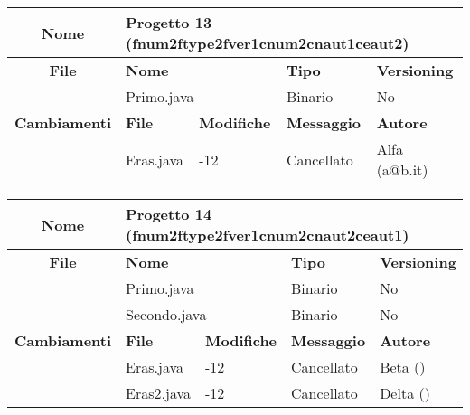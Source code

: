 \begin{table}[ht]
\footnotesize
\begin{tabular}{|c|p{2.5cm}|p{2cm}|p{2.5cm}|p{2.5cm}|}
  \hline
  \textbf{Nome}	& \multicolumn{4}{l|}{Progetto 13 (fnum2ftype2fver1cnum2cnaut1ceaut2)} 									\\
  \hline
  \rowcolor{lightgray}\textbf{File} 		& \multicolumn{2}{l|}{\textbf{Nome}}		& \textbf{Tipo}		& \textbf{Versioning} 		\\
						\cline{2-5}
						& \multicolumn{2}{l|}{Primo.java}		& Binario		& No				\\
  \hline
  \rowcolor{lightgray}\textbf{Cambiamenti}	& \textbf{File}		&\textbf{Modifiche}	& \textbf{Messaggio}	& \textbf{Autore}		\\
						\cline{2-5}
						& Eras.java		& -12	  		& Cancellato		& Alfa (a@b.it)			\\
						
  \hline
\end{tabular}
\end{table}

\begin{table}[ht]
\footnotesize
\begin{tabular}{|c|p{2.5cm}|p{2cm}|p{2.5cm}|p{2.5cm}|}
  \hline
  \textbf{Nome}	& \multicolumn{4}{l|}{Progetto 14 (fnum2ftype2fver1cnum2cnaut2ceaut1)} 									\\
  \hline
  \rowcolor{lightgray}\textbf{File} 		& \multicolumn{2}{l|}{\textbf{Nome}}		& \textbf{Tipo}		& \textbf{Versioning} 		\\
						\cline{2-5}
						& \multicolumn{2}{l|}{Primo.java}		& Binario		& No				\\
						\cline{2-5}
						& \multicolumn{2}{l|}{Secondo.java}		& Binario		& No				\\
  \hline
  \rowcolor{lightgray}\textbf{Cambiamenti}	& \textbf{File}		&\textbf{Modifiche}	& \textbf{Messaggio}	& \textbf{Autore}		\\
						\cline{2-5}
						& Eras.java		& -12	  		& Cancellato		& Beta ()			\\
						\cline{2-5}
						& Eras2.java		& -12	  		& Cancellato		& Delta ()			\\
  \hline
\end{tabular}
\end{table}

